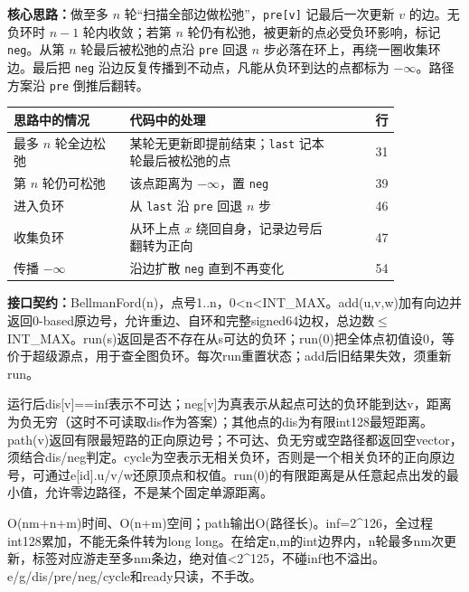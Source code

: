 \textbf{核心思路：}\allowbreak 做至多 $n$ 轮“扫描全部边做松弛”，\texttt{pre[v]} 记最后一次更新 $v$ 的边。无负环时 $n-1$ 轮内收敛；若第 $n$ 轮仍有松弛，被更新的点必受负环影响，标记 \texttt{neg}。从第 $n$ 轮最后被松弛的点沿 \texttt{pre} 回退 $n$ 步必落在环上，再绕一圈收集环边。最后把 \texttt{neg} 沿边反复传播到不动点，凡能从负环到达的点都标为 $-\infty$。路径方案沿 \texttt{pre} 倒推后翻转。

\begin{center}\small
\begin{tabular}{@{}p{0.30\linewidth}p{0.55\linewidth}r@{}}
\toprule
思路中的情况 & 代码中的处理 & 行\\
\midrule
最多 $n$ 轮全边松弛 & 某轮无更新即提前结束；\texttt{last} 记本轮最后被松弛的点 & 31\\
第 $n$ 轮仍可松弛 & 该点距离为 $-\infty$，置 \texttt{neg} & 39\\
进入负环 & 从 \texttt{last} 沿 \texttt{pre} 回退 $n$ 步 & 46\\
收集负环 & 从环上点 $x$ 绕回自身，记录边号后翻转为正向 & 47\\
传播 $-\infty$ & 沿边扩散 \texttt{neg} 直到不再变化 & 54\\
\bottomrule
\end{tabular}
\end{center}



{\sloppy{}\noindent\textbf{接口契约：}BellmanFord(n)，点号1..n，0<n<INT\_MAX。add(u,v,w)加有向边并返回0-based原边号，允许重边、自环和完整signed64边权，总边数$\le$INT\_MAX。run(s)返回是否不存在从s可达的负环；run(0)把全体点初值设0，等价于超级源点，用于查全图负环。每次run重置状态；add后旧结果失效，须重新run。

运行后dis[v]==inf表示不可达；neg[v]为真表示从起点可达的负环能到达v，距离为负无穷（这时不可读取dis作为答案）；其他点的dis为有限int128最短距离。path(v)返回有限最短路的正向原边号；不可达、负无穷或空路径都返回空vector，须结合dis/neg判定。cycle为空表示无相关负环，否则是一个相关负环的正向原边号，可通过e[id].u/v/w还原顶点和权值。run(0)的有限距离是从任意起点出发的最小值，允许零边路径，不是某个固定单源距离。

O(nm+n+m)时间、O(n+m)空间；path输出O(路径长)。inf=2\textasciicircum{}126，全过程int128累加，不能无条件转为long long。在给定n,m的int边界内，n轮最多nm次更新，标签对应游走至多nm条边，绝对值<2\textasciicircum{}125，不碰inf也不溢出。e/g/dis/pre/neg/cycle和ready只读，不手改。\par}




